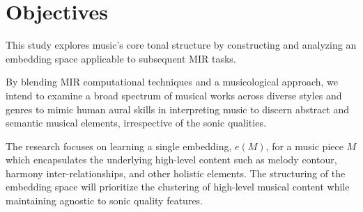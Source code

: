 \section{Objectives}

This study explores music's core tonal structure by constructing and analyzing an embedding space applicable to subsequent MIR tasks. 

By blending MIR computational techniques and a musicological approach, we intend to examine a broad spectrum of musical works across diverse styles and genres to mimic human aural skills in interpreting music to discern abstract and semantic musical elements, irrespective of the sonic qualities. 

The research focuses on learning a single embedding, $e(M)$, for a music piece $M$ which encapsulates the underlying high-level content such as melody contour, harmony inter-relationships, and other holistic elements. The structuring of the embedding space will prioritize the clustering of high-level musical content while maintaining agnostic to sonic quality features.